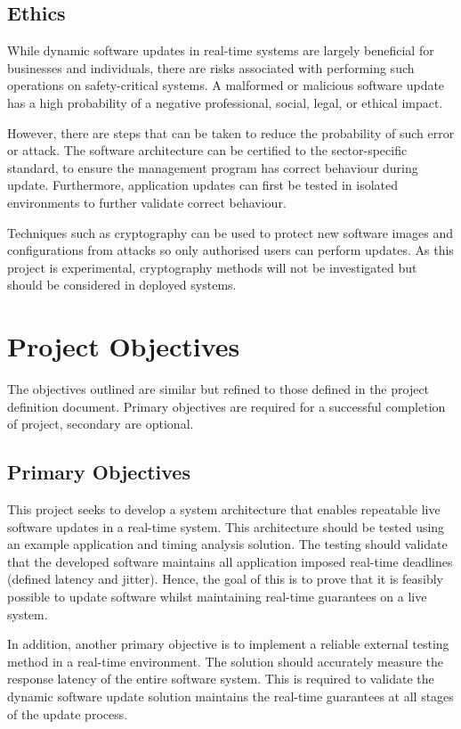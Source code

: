 \subsection{Ethics}

While dynamic software updates in real-time systems are largely beneficial for businesses and individuals, there are risks associated with performing such operations on safety-critical systems. A malformed or malicious software update has a high probability of a negative professional, social, legal, or ethical impact.

However, there are steps that can be taken to reduce the probability of such error or attack.
The software architecture can be certified to the sector-specific standard, to ensure the management program has correct behaviour during update. Furthermore, application updates can first be tested in isolated environments to further validate correct behaviour.

Techniques such as cryptography can be used to protect new software images and configurations from attacks so only authorised users can perform updates. As this project is experimental, cryptography methods will not be investigated but should be considered in deployed systems.

\newpage


\section{Project Objectives}

The objectives outlined are similar but refined to those defined in the project definition document. Primary objectives are required for a successful completion of project, secondary are optional.

\subsection{Primary Objectives}

This project seeks to develop a system architecture that enables repeatable live software updates in a real-time system. This architecture should be tested using an example application and timing analysis solution. The testing should validate that the developed software maintains all application imposed real-time deadlines (defined latency and jitter). Hence, the goal of this is to prove that it is feasibly possible to update software whilst maintaining real-time guarantees on a live system.

In addition, another primary objective is to implement a reliable external testing method in a real-time environment. The solution should accurately measure the response latency of the entire software system. This is required to validate the dynamic software update solution maintains the real-time guarantees at all stages of the update process.

